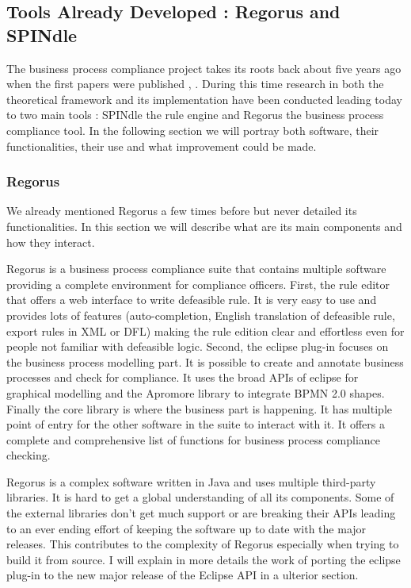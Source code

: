 \documentclass[10pt]{report}
\begin{document}
\subsection{Tools Already Developed : Regorus and SPINdle}

The business process compliance project takes its roots back about five years ago when the first papers were published \autocite{journeyToBPC}, \autocite{isf09compliance}. During this time research in both the theoretical framework and its implementation have been conducted leading today to two main tools : SPINdle the rule engine and Regorus the business process compliance tool. In the following section we will portray both software, their functionalities, their use and what improvement could be made.

\subsubsection{Regorus}
We already mentioned Regorus a few times before but never detailed its functionalities. In this section we will describe what are its main components and how they interact.

Regorus is a business process compliance suite that contains multiple software providing a complete environment for compliance officers. First, the rule editor that offers a web interface to write defeasible rule. It is very easy to use and provides lots of features (auto-completion, English translation of defeasible rule, export rules in XML or DFL) making the rule edition clear and effortless even for people not familiar with defeasible logic. Second, the eclipse plug-in focuses on the business process modelling part. It is possible to create and annotate business processes and check for compliance. It uses the broad APIs of eclipse for graphical modelling and the Apromore library to integrate BPMN 2.0 shapes. Finally the core library is where the business part is happening. It has multiple point of entry for the other software in the suite to interact with it. It offers a complete and comprehensive list of functions for business process compliance checking.

Regorus is a complex software written in Java and uses multiple third-party libraries. It is hard to get a global understanding of all its components. Some of the external libraries don't get much support or are breaking their APIs leading to an ever ending effort of keeping the software up to date with the major releases. This contributes to the complexity of Regorus especially when trying to build it from source. I will explain in more details the work of porting the eclipse plug-in to the new major release of the Eclipse API in a ulterior section.
\end{document}
